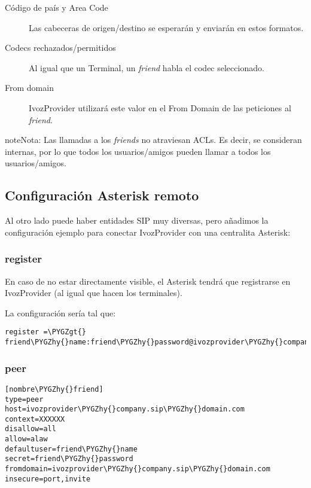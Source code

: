 \documentclass[letterpaper,10pt,spanish]{sphinxmanual}
\def\PYGZgt{\char`\>}
\def\PYGZhy{\char`\-}
\begin{document}
\begin{description}
\item[{Código de país y Area Code}] \leavevmode{}\label{pbx_features/friends:term-country-and-area-code}
Las cabeceras de origen/destino se esperarán y enviarán en estos formatos.

\item[{Codecs rechazados/permitidos}] \leavevmode{}\label{pbx_features/friends:term-allowed-codecs}
Al igual que un Terminal, un \emph{friend} habla el codec seleccionado.

\item[{From domain}] \leavevmode{}\label{pbx_features/friends:term-from-domain}
IvozProvider utilizará este valor en el From Domain de las peticiones al \emph{friend}.

\end{description}

\begin{notice}{note}{Nota:}
Las llamadas a los \emph{friends} no atraviesan ACLs. Es decir, se consideran internas, por lo que todos los usuarios/amigos pueden llamar a todos los usuarios/amigos.
\end{notice}


\subsection{Configuración Asterisk remoto}
\label{pbx_features/friends:asterisk-as-a-friend}
Al otro lado puede haber entidades SIP muy diversas, pero añadimos la configuración ejemplo para conectar IvozProvider con una centralita Asterisk:


\subsubsection{register}
\label{pbx_features/friends:register}
En caso de no estar directamente visible, el Asterisk tendrá que registrarse en IvozProvider (al igual que hacen los terminales).

La configuración sería tal que:

\begin{Verbatim}[commandchars=\\\{\}]
register =\PYGZgt{} friend\PYGZhy{}name:friend\PYGZhy{}password@ivozprovider\PYGZhy{}company.sip\PYGZhy{}domain.com
\end{Verbatim}


\subsubsection{peer}
\label{pbx_features/friends:peer}
\begin{Verbatim}[commandchars=\\\{\}]
[nombre\PYGZhy{}friend]
type=peer
host=ivozprovider\PYGZhy{}company.sip\PYGZhy{}domain.com
context=XXXXXX
disallow=all
allow=alaw
defaultuser=friend\PYGZhy{}name
secret=friend\PYGZhy{}password
fromdomain=ivozprovider\PYGZhy{}company.sip\PYGZhy{}domain.com
insecure=port,invite
\end{Verbatim}
\end{document}
